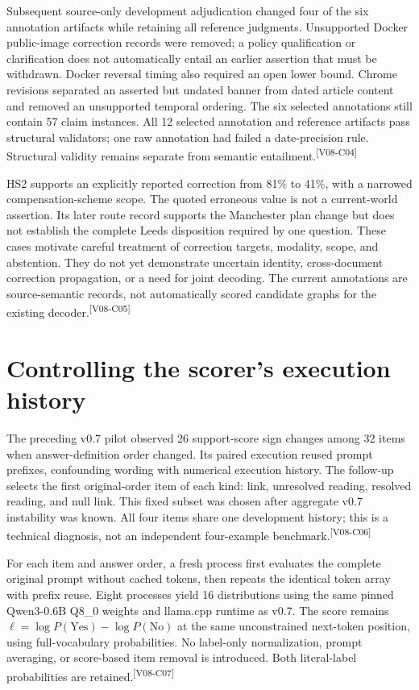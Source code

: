 \documentclass[10pt,letterpaper]{article}
\newcommand{\claim}[1]{\textsuperscript{\scriptsize[#1]}}
\begin{document}
Subsequent source-only development adjudication changed four of the six
annotation artifacts while retaining all reference judgments. Unsupported
Docker public-image correction records were removed; a policy qualification
or clarification does not automatically entail an earlier assertion that must
be withdrawn. Docker reversal timing also required an open lower bound.
Chrome revisions separated an asserted but undated banner from dated article
content and removed an unsupported temporal ordering. The six selected
annotations still contain 57 claim instances. All 12 selected annotation and
reference artifacts pass structural validators; one raw annotation had failed
a date-precision rule. Structural validity remains separate from semantic
entailment.\claim{V08-C04}

HS2 supports an explicitly reported correction from 81\% to 41\%, with a
narrowed compensation-scheme scope. The quoted erroneous value is not a
current-world assertion. Its later route record supports the Manchester plan
change but does not establish the complete Leeds disposition required by one
question. These cases motivate careful treatment of correction targets,
modality, scope, and abstention. They do not yet demonstrate uncertain identity,
cross-document correction propagation, or a need for joint decoding. The
current annotations are source-semantic records, not automatically scored
candidate graphs for the existing decoder.\claim{V08-C05}

\section{Controlling the scorer's execution history}
\label{sec:control}
The preceding v0.7 pilot observed 26 support-score sign changes among 32 items
when answer-definition order changed. Its paired execution reused prompt
prefixes, confounding wording with numerical execution history. The follow-up
selects the first original-order item of each kind: link, unresolved reading,
resolved reading, and null link. This fixed subset was chosen after aggregate
v0.7 instability was known. All four items share one development history; this
is a technical diagnosis, not an independent four-example benchmark.\claim{V08-C06}

For each item and answer order, a fresh process first evaluates the complete
original prompt without cached tokens, then repeats the identical token array
with prefix reuse. Eight processes yield 16 distributions using the same
pinned Qwen3-0.6B Q8\_0 weights and llama.cpp runtime as v0.7. The score remains
$\ell=\log P(\mathrm{Yes})-\log P(\mathrm{No})$ at the same unconstrained
next-token position, using full-vocabulary probabilities. No label-only
normalization, prompt averaging, or score-based item removal is introduced.
Both literal-label probabilities are retained.\claim{V08-C07}
\end{document}
